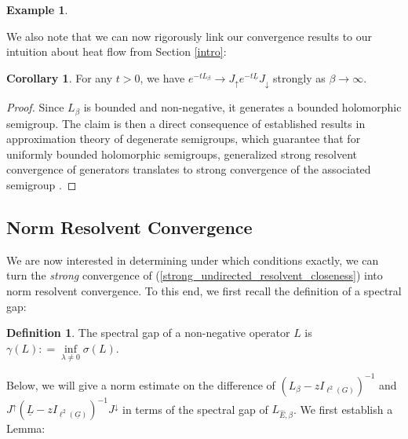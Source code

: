 \documentclass[reqno,12pt,letterpaper]{amsart}
\numberwithin{equation}{section}
\newcommand{\1}{\mathds{1}}
\theoremstyle{definition}
\newtheorem{Def}[Th]{Definition}
\newtheorem{Ex}[Th]{Example}
\newtheorem{Cor}[Th]{Corollary}
\begin{document}
\begin{Ex}
\begin{figure}[H]
\label{fig:pathgraph_reduced}
\end{figure}
	
		
		
	\end{Ex}







We also note that we can now rigorously link our convergence results to our intuition about heat flow from Section \ref{intro}:







\begin{Cor}\label{norm_dynamical_convergence_strong}
	For any $t > 0$, we have $e^{-tL_\beta} \rightarrow J_\uparrow e^{-t\underline{L}} J_\downarrow $ strongly as $\beta \rightarrow \infty$.
\end{Cor}
\begin{proof}
Since $L_\beta$ is bounded and non-negative, it generates a bounded holomorphic semigroup.
The claim is then a direct consequence of established results in approximation theory of degenerate semigroups, which guarantee that for uniformly bounded holomorphic semigroups, generalized strong resolvent convergence of generators translates to strong convergence of the associated semigroup \cite[Theorem 5.2]{arendt2001approximation}. 
\end{proof}
	
	\subsection{Norm Resolvent Convergence}\label{undirected_norm_resolvent_convergence}
We are now interested in determining under which conditions exactly, we can turn the \emph{strong} convergence of (\ref{strong_undirected_resolvent_closeness}) into norm resolvent convergence.
To this end, we first recall the definition of a spectral gap:
\begin{Def}The spectral gap of a non-negative operator $L$ is
$
	\gamma(L): = \inf\limits_{\lambda \neq 0} \sigma(L).
$
\end{Def}
Below, we will give a norm estimate on the difference
of $	(L_\beta - z I_{\ell^2(G)})^{-1}$  and $ J^\uparrow  (\underline{L} - z I_{\ell^2(\underline{G})})^{-1} J^\downarrow$ in terms of the spectral gap of $L_{\hat{E},\beta}$.
We  first establish a Lemma:
\end{document}
